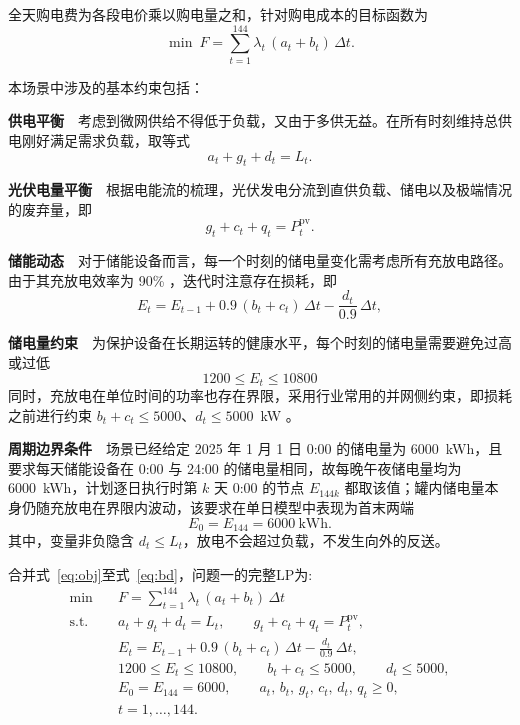 \documentclass[zihao=-4,a4paper,fontset=none]{ctexart}
\begin{document}
全天购电费为各段电价乘以购电量之和，针对购电成本的目标函数为
\begin{equation}
\min\ F=\sum_{t=1}^{144}\lambda_t\,(a_t+b_t)\,\Delta t .
\label{eq:obj}
\end{equation}

本场景中涉及的基本约束包括：

\textbf{供电平衡}\ \  考虑到微网供给不得低于负载，又由于多供无益。在所有时刻维持总供电刚好满足需求负载，取等式
\begin{equation}
a_t+g_t+d_t=L_t .
\label{eq:load}
\end{equation}

\textbf{光伏电量平衡}\ \  根据电能流的梳理，光伏发电分流到直供负载、储电以及极端情况的废弃量，即
\begin{equation}
g_t+c_t+q_t=P_t^{\mathrm{pv}} .
\label{eq:pv}
\end{equation}

\textbf{储能动态}\ \  对于储能设备而言，每一个时刻的储电量变化需考虑所有充放电路径。由于其充放电效率为 90\% ，迭代时注意存在损耗，即
\begin{equation}
E_t=E_{t-1}+0.9\,(b_t+c_t)\,\Delta t-\frac{d_t}{0.9}\,\Delta t ,
\label{eq:soc}
\end{equation}

\textbf{储电量约束}\ \  为保护设备在长期运转的健康水平，每个时刻的储电量需要避免过高或过低
\begin{equation}
1200\le E_t\le 10800
\label{eq:ebnd}
\end{equation}
同时，充放电在单位时间的功率也存在界限，采用行业常用的并网侧约束，即损耗之前进行约束  $b_t+c_t\le 5000$、$d_t\le 5000$~kW 。

\textbf{周期边界条件}\ \  场景已经给定 2025 年 1 月 1 日 0:00 的储电量为 6000~kWh，且要求每天储能设备在 0:00 与 24:00 的储电量相同，故每晚午夜储电量均为 6000~kWh，计划逐日执行时第 $k$ 天 0:00 的节点 $E_{144k}$ 都取该值；罐内储电量本身仍随充放电在界限内波动，该要求在单日模型中表现为首末两端
\begin{equation}
E_0=E_{144}=6000\ \mathrm{kWh} .
\label{eq:bd}
\end{equation}
其中，变量非负隐含 $d_t\le L_t$，放电不会超过负载，不发生向外的反送。

合并式~\eqref{eq:obj}至式~\eqref{eq:bd}，问题一的完整LP为:
\begin{equation}
\begin{aligned}
\min\quad & F=\sum_{t=1}^{144}\lambda_t\,(a_t+b_t)\,\Delta t \\
\text{s.t.}\quad
& a_t+g_t+d_t=L_t,\qquad g_t+c_t+q_t=P_t^{\mathrm{pv}}, \\
& E_t=E_{t-1}+0.9\,(b_t+c_t)\,\Delta t-\frac{d_t}{0.9}\,\Delta t,\\
& 1200\le E_t\le 10800,\qquad b_t+c_t\le 5000,\qquad d_t\le 5000,\\
& E_0=E_{144}=6000,\qquad a_t,\,b_t,\,g_t,\,c_t,\,d_t,\,q_t\ge 0,\\
& t=1,\dots,144 .
\end{aligned}
\label{eq:full}
\end{equation}
\end{document}
